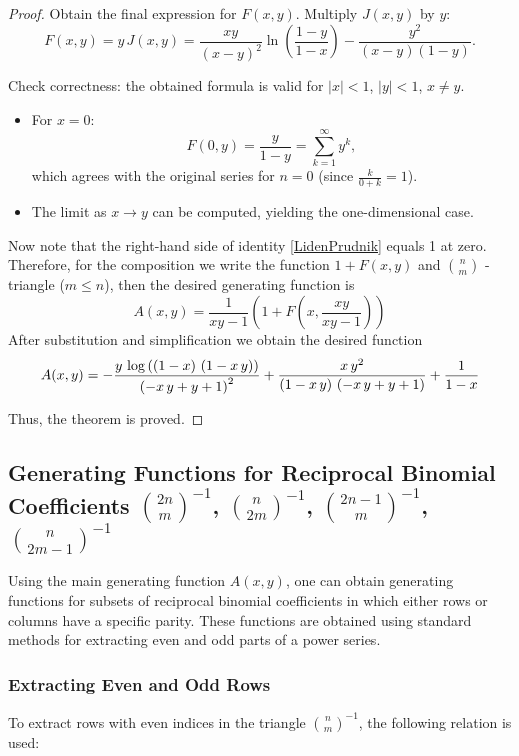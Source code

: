 \documentclass[12pt]{article}
\begin{document}
\begin{proof}
Obtain the final expression for $F(x,y)$. Multiply $J(x,y)$ by $y$:
   \[
   F(x,y) = y \, J(x,y) 
          = \frac{xy}{(x-y)^2} \ln\!\left( \frac{1-y}{1-x} \right) 
            - \frac{y^2}{(x-y)(1-y)}.
   \]

Check correctness: the obtained formula is valid for $|x|<1$, $|y|<1$, $x \neq y$.
   \begin{itemize}
     \item For $x=0$:
       \[
       F(0,y) = \frac{y}{1-y} = \sum_{k=1}^{\infty} y^k,
       \]
       which agrees with the original series for $n=0$ (since $\frac{k}{0+k}=1$).
     \item The limit as $x \to y$ can be computed, yielding the one-dimensional case.
   \end{itemize}
   
   
Now note that the right-hand side of identity \ref{LidenPrudnik} equals 1 at zero. Therefore, for the composition we write the function $1+F(x,y)$ and $\binom{n}{m}$ - triangle ($m\leqslant n$), then the desired generating function is
$$
A(x,y)=\frac{1}{xy-1}\left(1+F\left(x,\frac{xy}{xy-1}\right)\right)
$$ 
After substitution and simplification we obtain the desired function
$$A(x,y)=-{{y\,\log \left(\left(1-x\right)\,\left(1-x\,y\right)\right)
 }\over{\left(-x\,y+y+1\right)^2}}+{{x\,y^2}\over{\left(1-x\,y\right)
 \,\left(-x\,y+y+1\right)}}+{{1}\over{1-x}}$$ 

   Thus, the theorem is proved.
\end{proof}

\subsection{Generating Functions for Reciprocal Binomial Coefficients
$\binom{2n}{m}^{-1}$, $\binom{n}{2m}^{-1}$, $\binom{2n-1}{m}^{-1}$, $\binom{n}{2m-1}^{-1}$}

Using the main generating function $A(x,y)$, one can obtain generating functions for subsets of reciprocal binomial coefficients in which either rows or columns have a specific parity. These functions are obtained using standard methods for extracting even and odd parts of a power series.

\subsubsection{Extracting Even and Odd Rows}

To extract rows with even indices in the triangle $\binom{n}{m}^{-1}$, the following relation is used:
\end{document}
